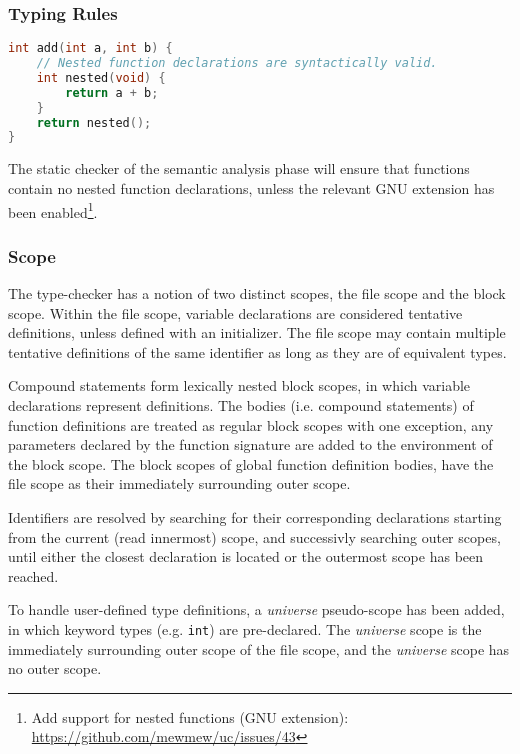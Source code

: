 \subsubsection{Typing Rules}

\begin{lstlisting}[language=C,style=c,caption={\label{fig:nested_func_decl}Nested function declarations.}]
int add(int a, int b) {
	// Nested function declarations are syntactically valid.
	int nested(void) {
		return a + b;
	}
	return nested();
}
\end{lstlisting}

The static checker of the semantic analysis phase will ensure that functions contain no nested function declarations, unless the relevant GNU extension has been enabled\footnote{Add support for nested functions (GNU extension): \url{https://github.com/mewmew/uc/issues/43}}.

\subsubsection{Scope}
\label{sec:scope}

The type-checker has a notion of two distinct scopes, the file scope and the block scope. Within the file scope, variable declarations are considered tentative definitions, unless defined with an initializer. The file scope may contain multiple tentative definitions of the same identifier as long as they are of equivalent types.

Compound statements form lexically nested block scopes, in which variable declarations represent definitions. The bodies (i.e. compound statements) of function definitions are treated as regular block scopes with one exception, any parameters declared by the function signature are added to the environment of the block scope. The block scopes of global function definition bodies, have the file scope as their immediately surrounding outer scope.

Identifiers are resolved by searching for their corresponding declarations starting from the current (read innermost) scope, and successivly searching outer scopes, until either the closest declaration is located or the outermost scope has been reached.

To handle user-defined type definitions, a \textit{universe} pseudo-scope has been added, in which keyword types (e.g. \texttt{int}) are pre-declared. The \textit{universe} scope is the immediately surrounding outer scope of the file scope, and the \textit{universe} scope has no outer scope.

